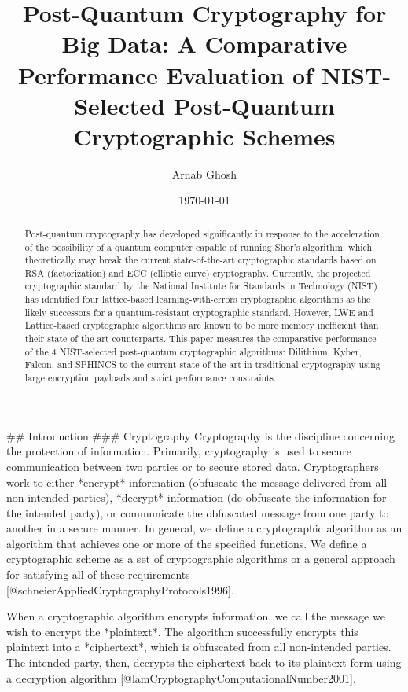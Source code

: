 \documentclass[12pt]{article}
\title{Post-Quantum Cryptography for Big Data: A Comparative Performance Evaluation of NIST-Selected Post-Quantum Cryptographic Schemes}
\author{Arnab Ghosh}
\date{\today}
\begin{document}
\maketitle

\begin{abstract}
    Post-quantum cryptography has developed significantly in response to the acceleration of the possibility of a quantum computer capable of running Shor's algorithm, which theoretically may break the current state-of-the-art cryptographic standards based on RSA (factorization) and ECC (elliptic curve) cryptography. 
    Currently, the projected cryptographic standard by the National Institute for Standards in Technology (NIST) has identified four lattice-based learning-with-errors cryptographic algorithms as the likely successors for a quantum-resistant cryptographic standard. 
    However, LWE and Lattice-based cryptographic algorithms are known to be more memory inefficient than their state-of-the-art counterparts. 
    This paper measures the comparative performance of the 4 NIST-selected post-quantum cryptographic algorithms: Dilithium, Kyber, Falcon, and SPHINCS to the current state-of-the-art in traditional cryptography using large encryption payloads and strict performance constraints.  
\end{abstract}
## Introduction
### Cryptography
Cryptography is the discipline concerning the protection of information. Primarily, cryptography is used to secure communication between two parties or to secure stored data. Cryptographers work to either *encrypt* information (obfuscate the message delivered from all non-intended parties), *decrypt* information (de-obfuscate the information for the intended party), or communicate the obfuscated message from one party to another in a secure manner. In general, we define a cryptographic algorithm as an algorithm that achieves one or more of the specified functions. We define a cryptographic scheme as a set of cryptographic algorithms or a general approach for satisfying all of these requirements [@schneierAppliedCryptographyProtocols1996]. 

When a cryptographic algorithm encrypts information, we call the message we wish to encrypt the *plaintext*. The algorithm successfully encrypts this plaintext into a *ciphertext*, which is obfuscated from all non-intended parties. The intended party, then, decrypts the ciphertext back to its plaintext form using a decryption algorithm [@lamCryptographyComputationalNumber2001].  
\end{document}
